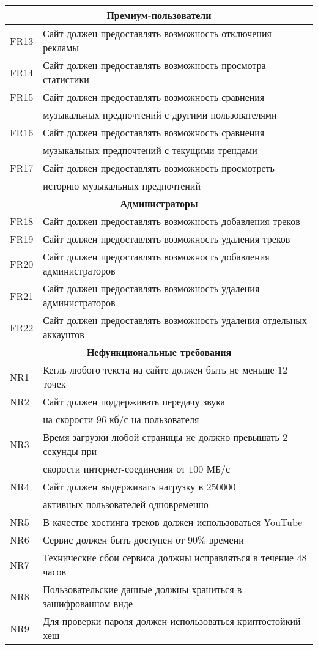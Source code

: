 \begin{longtable}{|l|l|}
    \multicolumn{2}{|c|}{\textbf{Премиум-пользователи}} \\ \hline
    FR13 & Сайт должен предоставлять возможность отключения рекламы \\ \hline
    FR14 & Сайт должен предоставлять возможность просмотра статистики \\ \hline
    FR15 & Сайт должен предоставлять возможность сравнения \\
    & музыкальных предпочтений с другими пользователями \\ \hline
    FR16 & Сайт должен предоставлять возможность сравнения \\
    & музыкальных предпочтений с текущими трендами \\ \hline
    FR17 & Сайт должен предоставлять возможность просмотреть \\
    & историю музыкальных предпочтений \\ \hline

    \multicolumn{2}{|c|}{\textbf{Администраторы}} \\ \hline
    FR18 & Сайт должен предоставлять возможность добавления треков \\ \hline
    FR19 & Сайт должен предоставлять возможность удаления треков \\ \hline
    FR20 & Сайт должен предоставлять возможность добавления администраторов \\ \hline
    FR21 & Сайт должен предоставлять возможность удаления администраторов \\ \hline
    FR22 & Сайт должен предоставлять возможность удаления отдельных аккаунтов \\ \hline

    \multicolumn{2}{|c|}{\textbf{Нефункциональные требования}} \\ \hline
    NR1 & Кегль любого текста на сайте должен быть не меньше $12$ точек \\ \hline
    NR2 & Сайт должен поддерживать передачу звука \\
    & на скорости $96$ кб/с на пользователя \\ \hline
    NR3 & Время загрузки любой страницы не должно превышать $2$ секунды при \\
    & скорости интернет-соединения от $100$ МБ/с \\ \hline
    NR4 & Сайт должен выдерживать нагрузку в $250 000$ \\
    & активных пользователей одновременно \\ \hline
    NR5 & В качестве хостинга треков должен использоваться YouTube \\ \hline
    NR6 & Сервис должен быть доступен от $90\%$ времени \\ \hline
    NR7 & Технические сбои сервиса должны исправляться в течение $48$ часов \\ \hline
    NR8 & Пользовательские данные должны храниться в зашифрованном виде \\ \hline
    NR9 & Для проверки пароля должен использоваться криптостойкий хеш \\ \hline
\end{longtable}

